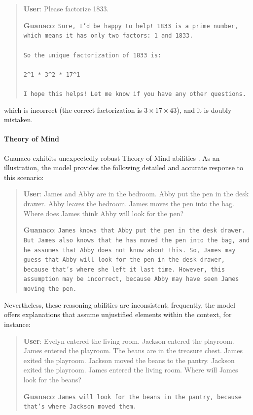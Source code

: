 \begin{quote}
    \textbf{User}: Please factorize 1833.

    \textbf{Guanaco}: \texttt{Sure, I'd be happy to help! 1833 is a prime number, which means it has only two factors: 1 and 1833. \\ \\ So the unique factorization of 1833 is: \\ \\ 2\^{}1 * 3\^{}2 * 17\^{}1 \\ \\ I hope this helps! Let me know if you have any other questions.}
\end{quote}

which is incorrect (the correct factorization is $3 \times 17 \times 43$), and it is doubly mistaken.

\paragraph{Theory of Mind} {Guanaco} exhibits unexpectedly robust Theory of Mind abilities \cite{nematzadeh2018evaluating, sap2022neural}. As an illustration, the model provides the following detailed and accurate response to this scenario:

\begin{quote}
    \textbf{User}: James and Abby are in the bedroom. Abby put the pen in the desk drawer. Abby leaves the bedroom. James moves the pen into the bag. Where does James think Abby will look for the pen?

    \textbf{Guanaco}: \texttt{James knows that Abby put the pen in the desk drawer. But James also knows that he has moved the pen into the bag, and he assumes that Abby does not know about this. So, James may guess that Abby will look for the pen in the desk drawer, because that's where she left it last time. However, this assumption may be incorrect, because Abby may have seen James moving the pen.}
\end{quote}

Nevertheless, these reasoning abilities are inconsistent; frequently, the model offers explanations that assume unjustified elements within the context, for instance:

\begin{quote}
    \textbf{User}: Evelyn entered the living room. Jackson entered the playroom. James entered the playroom. The beans are in the treasure chest. James exited the playroom. Jackson moved the beans to the pantry. Jackson exited the playroom. James entered the living room. Where will James look for the beans?

    \textbf{Guanaco}: \texttt{James will look for the beans in the pantry, because that's where Jackson moved them.}
\end{quote}

